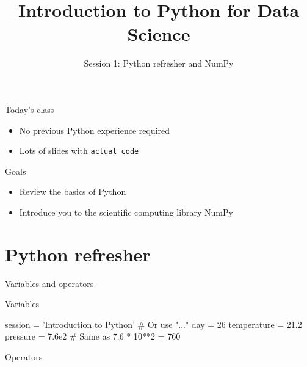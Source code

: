 

\title{Introduction to Python for Data Science}
\subtitle{Session 1: Python refresher and NumPy}



\maketitle

\begin{frame}{Today's class}
    \begin{itemize}
        \item No previous Python experience required
        \item Lots of slides with \texttt{actual code}
    \end{itemize}
    \vfill
    \begin{block}{Goals}
        \begin{itemize}
            \item Review the basics of Python
            \item Introduce you to the scientific computing library NumPy
        \end{itemize}
    \end{block}
\end{frame}

\section{Python refresher}

\begin{frame}[fragile]{Variables and operators}
    \vspace{0.5em}
    \begin{block}{Variables}
        \begin{py3}
            session = 'Introduction to Python'  # Or use "..."
            day = 26
            temperature = 21.2
            pressure = 7.6e2  # Same as 7.6 * 10**2 = 760
        \end{py3}
    \end{block}
    \vspace{-0.75em}
    \begin{block}{Operators}
    \end{block}
\end{frame}

